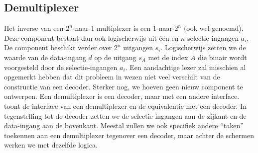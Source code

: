 \subsection{Demultiplexer}
Het inverse van een $2^n$-naar-$1$ multiplexer is een $1$-naar-$2^n$  (ook wel  genoemd). Deze component bestaat dan ook logischerwijs uit \'e\'en  en $n$ selectie-ingangen $a_i$. De component beschikt verder over $2^n$ uitgangen $s_i$. Logischerwijs zetten we de waarde van de data-ingang $d$ op de uitgang $s_A$ met de index $A$ die binair wordt voorgesteld door de selectie-ingangen $a_i$. Een aandachtige lezer zal misschien al opgemerkt hebben dat dit probleem in wezen niet veel verschilt van de constructie van een decoder. Sterker nog, we hoeven geen nieuw component te ontwerpen. Een demultiplexer is een decoder, maar met een andere interface.  toont de interface van een demultiplexer en de equivalentie met een decoder. In tegenstelling tot de decoder zetten we de selectie-ingangen aan de zijkant en de data-ingang aan de bovenkant. Meestal zullen we ook specifiek andere ``taken'' toekennen aan een demultiplexer tegenover een decoder, maar achter de schermen werken we met dezelfde logica.

